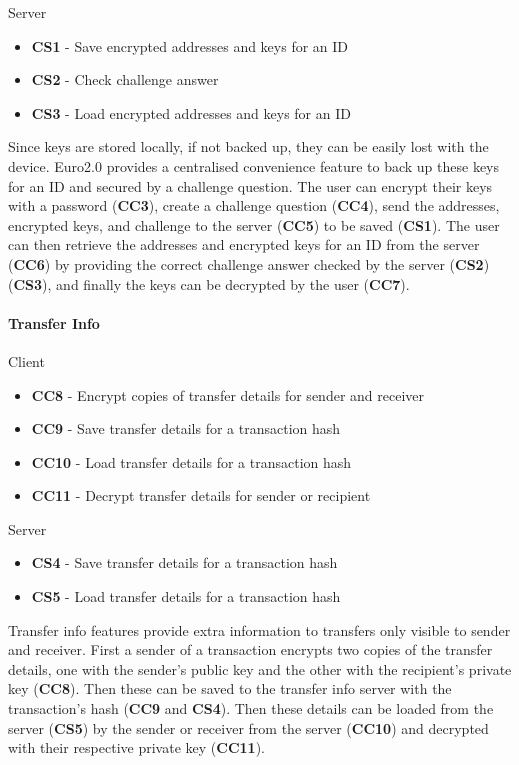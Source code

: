 \documentclass[12pt]{article} %
\begin{document}
{{Server
\begin{itemize}
	\item \textbf{CS1} - Save encrypted addresses and keys for an ID
	\item \textbf{CS2} - Check challenge answer
	\item \textbf{CS3} - Load encrypted addresses and keys for an ID
\end{itemize}

Since keys are stored locally, if not backed up, they can be easily lost with the device. Euro2.0 provides a centralised convenience feature to back up these keys for an ID and secured by a challenge question. The user can encrypt their keys with a password (\textbf{CC3}), create a challenge question (\textbf{CC4}), send the addresses, encrypted keys, and challenge to the server (\textbf{CC5}) to be saved (\textbf{CS1}). The user can then retrieve the addresses and encrypted keys for an ID from the server (\textbf{CC6}) by providing the correct challenge answer checked by the server (\textbf{CS2}) (\textbf{CS3}), and finally the keys can be decrypted by the user (\textbf{CC7}).

\paragraph{Transfer Info}

Client
\begin{itemize}
	\item \textbf{CC8} - Encrypt copies of transfer details for sender and receiver
	\item \textbf{CC9} - Save transfer details for a transaction hash
	\item \textbf{CC10} - Load transfer details for a transaction hash
	\item \textbf{CC11} - Decrypt transfer details for sender or recipient
\end{itemize}

Server
\begin{itemize}
	\item \textbf{CS4} - Save transfer details for a transaction hash
	\item \textbf{CS5} - Load transfer details for a transaction hash
\end{itemize}

Transfer info features provide extra information to transfers only visible to sender and receiver. First a sender of a transaction encrypts two copies of the transfer details, one with the sender's public key and the other with the recipient's private key (\textbf{CC8}). Then these can be saved to the transfer info server with the transaction's hash (\textbf{CC9} and \textbf{CS4}). Then these details can be loaded from the server (\textbf{CS5}) by the sender or receiver from the server (\textbf{CC10}) and decrypted with their respective private key (\textbf{CC11}).

}}
\end{document}
